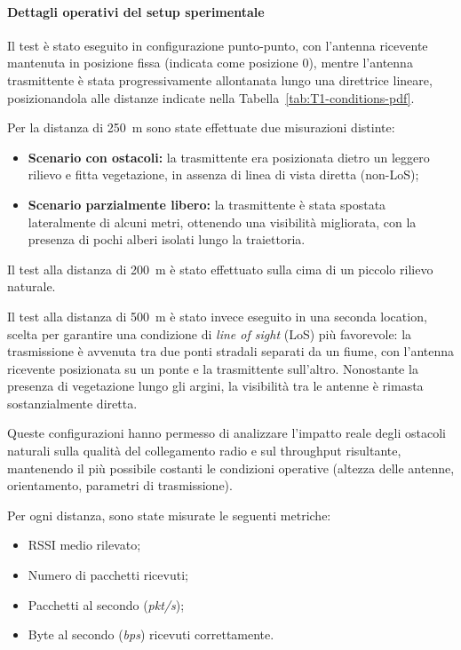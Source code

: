 \documentclass[12pt,a4paper,twoside]{book}
\begin{document}
\paragraph{Dettagli operativi del setup sperimentale}

Il test è stato eseguito in configurazione punto-punto, con l'antenna ricevente
mantenuta in posizione fissa (indicata come posizione 0), mentre l'antenna trasmittente
è stata progressivamente allontanata lungo una direttrice lineare, posizionandola
alle distanze indicate nella Tabella~\ref{tab:T1-conditions-pdf}.

Per la distanza di 250~m sono state effettuate due misurazioni distinte:
\begin{itemize}
    \item \textbf{Scenario con ostacoli:} la trasmittente era posizionata dietro
          un leggero rilievo e fitta vegetazione, in assenza di linea di vista diretta (non-LoS);

    \item \textbf{Scenario parzialmente libero:} la trasmittente è stata spostata
          lateralmente di alcuni metri, ottenendo una visibilità migliorata, con la presenza
          di pochi alberi isolati lungo la traiettoria.
\end{itemize}

Il test alla distanza di 200~m è stato effettuato sulla cima di un piccolo rilievo naturale.

Il test alla distanza di 500~m è stato invece eseguito in una seconda location,
scelta per garantire una condizione di \emph{line of sight} (LoS) più favorevole:
la trasmissione è avvenuta tra due ponti stradali separati da un fiume, con l’antenna
ricevente posizionata su un ponte e la trasmittente sull'altro. Nonostante la presenza
di vegetazione lungo gli argini, la visibilità tra le antenne è rimasta sostanzialmente diretta.

Queste configurazioni hanno permesso di analizzare l'impatto reale degli ostacoli naturali
sulla qualità del collegamento radio e sul throughput risultante, mantenendo il
più possibile costanti le condizioni operative (altezza delle antenne, orientamento,
parametri di trasmissione).

Per ogni distanza, sono state misurate le seguenti metriche:
\begin{itemize}
    \item \ac{RSSI} medio rilevato;
    \item Numero di pacchetti ricevuti;
    \item Pacchetti al secondo (\emph{pkt/s});
    \item Byte al secondo (\emph{bps}) ricevuti correttamente.
\end{itemize}
\end{document}
